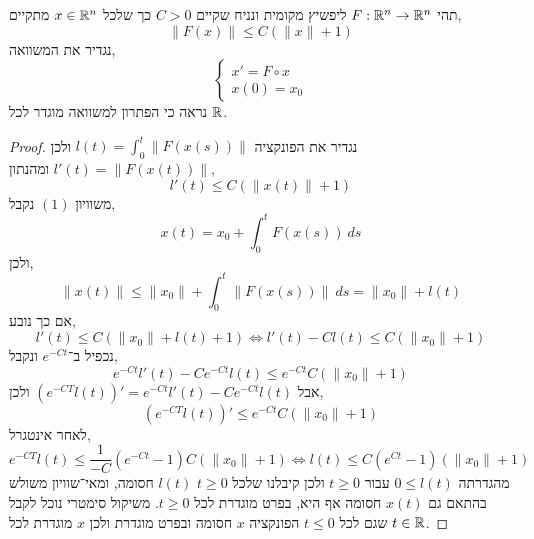 \question{}
תהי $F : \mathbb{R}^n \to \mathbb{R}^n$ ליפשיץ מקומית ונניח שקיים $C > 0$ כך שלכל $x \in \mathbb{R}^n$ מתקיים,
\[
	\lVert F(x) \rVert
	\le C(\lVert x \rVert + 1)
\]
נגדיר את המשוואה,
\[
	\begin{cases}
		x' = F \circ x \\
		x(0) = x_0
	\end{cases}
	\tag{1}
\]
נראה כי הפתרון למשוואה מוגדר לכל $\mathbb{R}$.
\begin{proof}
	נגדיר את הפונקציה $l(t) = \int_{0}^{t} \lVert F(x(s)) \rVert$ ולכן $l'(t) = \lVert F(x(t)) \rVert$ ומהנתון,
	\[
		l'(t)
		\le C(\lVert x(t) \rVert + 1)
	\]
	משוויון $(1)$ נקבל,
	\[
		x(t)
		= x_0 + \int_{0}^{t} F(x(s))\ ds
	\]
	ולכן,
	\[
		\lVert x(t) \rVert
		\le \lVert x_0 \rVert + \int_{0}^{t} \lVert F(x(s)) \rVert\ ds
		= \lVert x_0 \rVert + l(t)
	\]
	אם כך נובע,
	\[
		l'(t)
		\le C(\lVert x_0 \rVert + l(t) + 1)
		\iff l'(t) - C l(t) \le C(\lVert x_0 \rVert + 1)
	\]
	נכפיל ב־$e^{-Ct}$ ונקבל,
	\[
		e^{-Ct} l'(t) - C e^{-Ct} l(t)
		\le e^{-Ct} C (\lVert x_0 \rVert + 1)
	\]
	אבל $(e^{-CT} l(t))' = e^{-Ct} l'(t) - C e^{-Ct} l(t)$ ולכן,
	\[
		(e^{-CT} l(t))'
		\le e^{-Ct} C (\lVert x_0 \rVert + 1)
	\]
	לאחר אינטגרל,
	\[
		e^{-CT} l(t)
		\le \frac{1}{-C} (e^{-Ct} - 1) C (\lVert x_0 \rVert + 1)
		\iff l(t) \le C (e^{Ct} - 1) (\lVert x_0 \rVert + 1)
	\]
	מהגדרתה $0 \le l(t)$ עבור $t \ge 0$ ולכן קיבלנו שלכל $t \ge 0$ $l(t)$ חסומה, ומאי־שוויון משולש בהתאם גם $x(t)$ חסומה אף היא, בפרט מוגדרת לכל $t \ge 0$.
	משיקול סימטרי נוכל לקבל שגם לכל $t \le 0$ הפונקציה $x$ חסומה ובפרט מוגדרת ולכן $x$ מוגדרת לכל $t \in \mathbb{R}$.
\end{proof}



